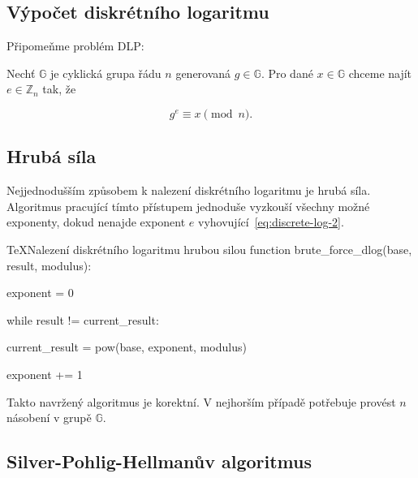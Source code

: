 \documentclass[
  program=infoi,
  biblatex,
  figures=false,
  glossaries,
  index
]{kidiplom}
\begin{document}
        \subsection{Výpočet diskrétního logaritmu}\label{sub:computing-discrete-log}

        Připomeňme problém DLP:

        Nechť $\mathbb{G}$ je cyklická grupa řádu $n$ generovaná $g \in \mathbb{G}$.
        Pro dané $x \in \mathbb{G}$ chceme najít $e \in \mathbb{Z}_n$ tak, že
        
        \begin{equation}\label{eq:discrete-log-2}
            g^e \equiv x \pmod{n}.
        \end{equation}
        

        \subsection{Hrubá síla}\label{sub:brute-forcing-discrete-log}
            Nejjednodušším způsobem k nalezení diskrétního logaritmu je hrubá síla.
            Algoritmus pracující tímto přístupem jednoduše vyzkouší všechny možné exponenty,
            dokud nenajde exponent $e$ vyhovující~\ref{eq:discrete-log-2}.
            
            \begin{kicode}{TeX}{}{Nalezení diskrétního logaritmu hrubou silou}
                function brute_force_dlog(base, result, modulus):

                exponent = 0

                while result != current_result:

                    current_result = pow(base, exponent, modulus)
                                    
                    exponent += 1
        
            \end{kicode}

            Takto navržený algoritmus je korektní. V nejhorším případě potřebuje provést $n$ násobení v grupě $\mathbb{G}$.


        \subsection{Silver-Pohlig-Hellmanův algoritmus}\label{sub:silver-pohlig-hellman}
\end{document}
